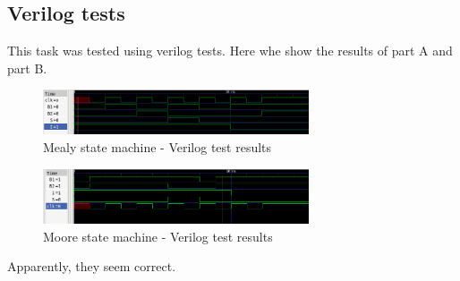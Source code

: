 \subsection *{Verilog tests}
This task was tested using verilog tests. Here whe show the results of part A and part B.

\begin{figure}[H]
    \begin{centering}
    \includegraphics[width=0.7\textwidth]{data/Graficos1/ej1a.png}
    \par\end{centering}
    \caption{Mealy state machine - Verilog test results}
\end{figure}

\begin{figure}[H]
    \begin{centering}
    \includegraphics[width=0.7\textwidth]{data/Graficos1/ej1b.png}
    \par\end{centering}
    \caption{Moore state machine - Verilog test results}
\end{figure}

Apparently, they seem correct.

